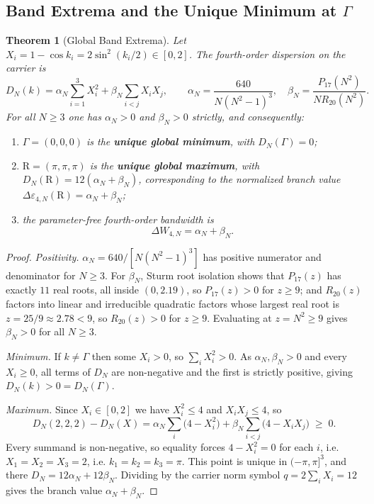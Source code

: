\documentclass[11pt,a4paper]{article}
\newtheorem{theorem}{Theorem}[section]
\theoremstyle{definition}
\begin{document}
\subsection{Band Extrema and the Unique Minimum at \texorpdfstring{$\Gamma$}{Gamma}}

\begin{theorem}[Global Band Extrema]\label{thm:band_extrema}
Let $X_i = 1-\cos k_i = 2\sin^2(k_i/2)\in[0,2]$. The fourth-order dispersion on the carrier is
\begin{equation}\label{eq:DN_formula}
  D_N(k) = \alpha_N\sum_{i=1}^3 X_i^2 + \beta_N\sum_{i<j}X_iX_j,
  \qquad \alpha_N = \frac{640}{N(N^2-1)^3}, \quad \beta_N = \frac{P_{17}(N^2)}{N R_{20}(N^2)} .
\end{equation}
For all $N\ge3$ one has $\alpha_N>0$ and $\beta_N>0$ strictly, and consequently:
\begin{enumerate}\itemsep1pt
  \item $\Gamma = (0,0,0)$ is the \textbf{unique global minimum}, with $D_N(\Gamma) = 0$;
  \item $\mathrm{R} = (\pi,\pi,\pi)$ is the \textbf{unique global maximum}, with $D_N(\mathrm{R}) = 12(\alpha_N+\beta_N)$, corresponding to the normalized branch value $\Delta\varepsilon_{4,N}(\mathrm{R}) = \alpha_N+\beta_N$;
  \item the parameter-free fourth-order bandwidth is
  \begin{equation}\label{eq:bandwidth}
    \Delta W_{4,N} = \alpha_N + \beta_N .
  \end{equation}
\end{enumerate}
\end{theorem}

\begin{proof}
\emph{Positivity.} $\alpha_N = 640/[N(N^2-1)^3]$ has positive numerator and denominator for $N\ge3$. For $\beta_N$, Sturm root isolation shows that $P_{17}(z)$ has exactly $11$ real roots, all inside $(0,2.19)$, so $P_{17}(z)>0$ for $z\ge9$; and $R_{20}(z)$ factors into linear and irreducible quadratic factors whose largest real root is $z = 25/9 \approx 2.78 < 9$, so $R_{20}(z)>0$ for $z\ge9$. Evaluating at $z=N^2\ge9$ gives $\beta_N>0$ for all $N\ge3$.

\emph{Minimum.} If $k\ne\Gamma$ then some $X_i>0$, so $\sum_i X_i^2>0$. As $\alpha_N,\beta_N>0$ and every $X_i\ge0$, all terms of $D_N$ are non-negative and the first is strictly positive, giving $D_N(k) > 0 = D_N(\Gamma)$.

\emph{Maximum.} Since $X_i\in[0,2]$ we have $X_i^2\le4$ and $X_iX_j\le4$, so
\begin{equation*}
  D_N(2,2,2) - D_N(X) = \alpha_N\sum_{i}\bigl(4 - X_i^2\bigr) + \beta_N\sum_{i<j}\bigl(4 - X_iX_j\bigr) \;\ge\; 0 .
\end{equation*}
Every summand is non-negative, so equality forces $4 - X_i^2 = 0$ for each $i$, i.e. $X_1=X_2=X_3=2$, i.e. $k_1=k_2=k_3=\pi$. This point is unique in $(-\pi,\pi]^3$, and there $D_N = 12\alpha_N + 12\beta_N$. Dividing by the carrier norm symbol $q = 2\sum_i X_i = 12$ gives the branch value $\alpha_N+\beta_N$.
\end{proof}
\end{document}
